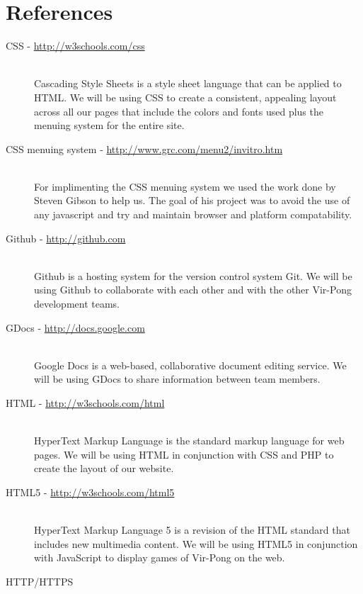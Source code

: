 %

\section{References}

	\begin{description}
	
		\item[CSS - \url{http://w3schools.com/css}] \hfill \\
			Cascading Style Sheets is a style sheet language that can be applied to HTML. We will be using CSS to create a consistent, appealing layout across all our pages that include the colors and fonts used plus the menuing system for the entire site.
		\item[CSS menuing system - \url{http://www.grc.com/menu2/invitro.htm}] \hfill \\
			For implimenting the CSS menuing system we used the work done by Steven Gibson to help us. The goal of his project was to avoid the use of any javascript and try and maintain browser and platform compatability.
		\item[Github - \url{http://github.com}] \hfill \\
			Github is a hosting system for the version control system Git. We will be using Github to collaborate with each other and with the other Vir-Pong development teams.
		\item[GDocs - \url{http://docs.google.com}] \hfill \\
			Google Docs is a web-based, collaborative document editing service. We will be using GDocs to share information between team members.
		\item[HTML - \url{http://w3schools.com/html}] \hfill \\
			HyperText Markup Language is the standard markup language for web pages. We will be using HTML in conjunction with CSS and PHP to create the layout of our website.
		\item[HTML5 - \url{http://w3schools.com/html5}] \hfill \\
			HyperText Markup Language 5 is a revision of the HTML standard that includes new multimedia content. We will be using HTML5 in conjunction with JavaScript to display games of Vir-Pong on the web.
		\item[HTTP/HTTPS] \hfill \\

\end{description}
